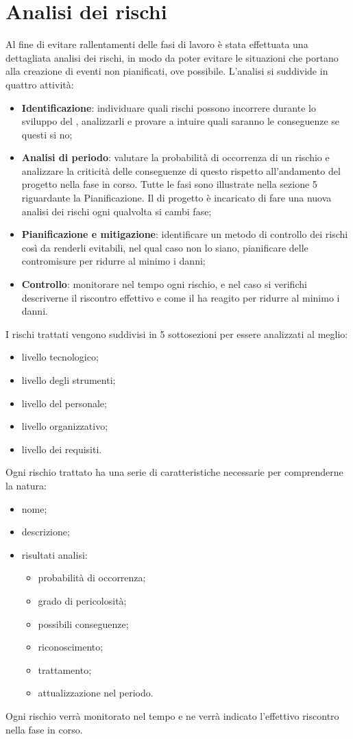 \documentclass[PianoDiProgetto.tex]{subfiles}
\begin{document}
\section{Analisi dei rischi}
Al fine di evitare rallentamenti delle fasi di lavoro è stata effettuata una dettagliata analisi dei rischi, in modo da poter evitare le situazioni che portano alla creazione di eventi non pianificati, ove possibile. L'analisi si suddivide in quattro attività:
	\begin{itemize}
		\item \textbf{Identificazione}: individuare quali rischi possono incorrere durante lo sviluppo del , analizzarli e provare a intuire quali saranno le conseguenze se questi si no;
		\item \textbf{Analisi di periodo}: valutare la probabilità di occorrenza di un rischio e analizzare la criticità delle conseguenze di questo rispetto all'andamento del progetto nella fase in corso. Tutte le fasi sono illustrate nella sezione 5 riguardante la Pianificazione. Il \RESP{} di progetto è incaricato  di fare una nuova analisi dei rischi ogni qualvolta si cambi fase;
		\item \textbf{Pianificazione e mitigazione}: identificare un metodo di controllo dei rischi così da renderli evitabili, nel qual caso non lo siano, pianificare delle contromisure per ridurre al minimo i danni;
		\item \textbf{Controllo}: monitorare nel tempo ogni rischio, e nel caso si verifichi descriverne il riscontro effettivo e come il  ha reagito per ridurre al minimo i danni.
	\end{itemize}
I rischi trattati vengono suddivisi in 5 sottosezioni per essere analizzati al meglio:
	\begin{itemize}
		\item livello tecnologico;
		\item livello degli strumenti;
		\item livello del personale;
		\item livello organizzativo;
		\item livello dei requisiti.
	\end{itemize}
Ogni rischio trattato ha una serie di caratteristiche necessarie per comprenderne la natura:
	\begin{itemize}
		\item nome;
		\item descrizione;
		\item risultati analisi:
			\begin{itemize}
				\item probabilità di occorrenza;
				\item grado di pericolosità;
				\item possibili conseguenze;
				\item riconoscimento;
				\item trattamento;
				\item attualizzazione nel periodo.
			\end{itemize}
	\end{itemize}
Ogni rischio verrà monitorato nel tempo e ne verrà indicato l'effettivo riscontro nella fase in corso.
\end{document}
